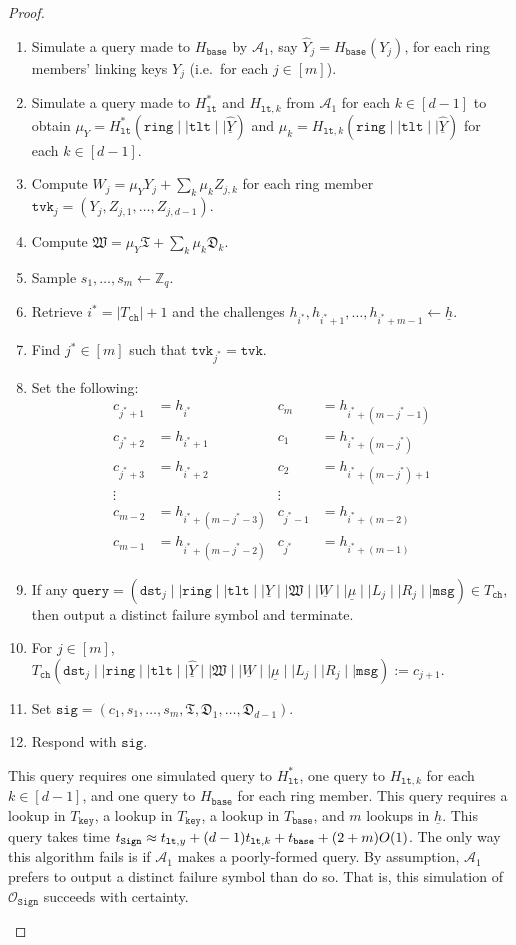 \documentclass[11pt]{article}
\theoremstyle{definition}
\newcommand{\lt}{\texttt{lt}}
\newcommand{\tlt}{\texttt{tlt}}
\newcommand{\tvk}{\texttt{tvk}}
\newcommand{\ring}{\texttt{ring}}
\newcommand{\sig}{\texttt{sig}}
\newcommand{\Zq}{\mathbb{Z}_q}
\newcommand{\msg}{\texttt{msg}}
\newcommand{\sign}{\texttt{Sign}}
\newcommand{\signingOracle}{\mathcal{O}_{\sign}}
\newcommand{\signaturequery}{(\texttt{dst}_{j} \mid \mid \ring \mid \mid \tlt \mid \mid \underline{\widehat{Y}} \mid \mid \mathfrak{W} \mid \mid \underline{W} \mid \mid \underline{\mu} \mid \mid L_{j} \mid \mid R_{j} \mid \mid \msg)}
\begin{document}
\begin{proof}
\begin{enumerate}
\begin{enumerate}
\begin{enumerate}
\item Simulate a query made to $H_{\texttt{base}}$ by $\mathcal{A}_1$, say $\widehat{Y}_j = H_{\texttt{base}}(Y_j)$, for each ring members' linking keys $Y_j$ (i.e.\ for each $j \in [m]$).
\item Simulate a query made to $H_{\lt}^*$ and $H_{\lt, k}$ from $\mathcal{A}_1$ for each $k \in [d-1]$ to obtain $\mu_Y = H_{\lt}^*(\ring \mid \mid \tlt \mid \mid \underline{\widehat{Y}})$ and $\mu_k = H_{\lt, k}(\ring \mid \mid \tlt \mid \mid \underline{\widehat{Y}})$ for each $k \in [d-1]$.
\item Compute $W_j = \mu_Y Y_j + \sum_k \mu_k Z_{j,k}$ for each ring member $\tvk_j = (Y_j, Z_{j,1}, \ldots, Z_{j,d-1})$.
\item Compute $\mathfrak{W} = \mu_Y \mathfrak{T} + \sum_k \mu_k \mathfrak{D}_k$.
\item Sample $s_1, \ldots, s_m \leftarrow \Zq$.
\item Retrieve $i^* = \left|T_{\texttt{ch}}\right| + 1$ and the challenges $h_{i^*}, h_{i^*+1}, \ldots, h_{i^*+m-1} \leftarrow \underline{h}$.
\item Find $j^* \in [m]$ such that $\tvk_{j^*} = \tvk$.
\item Set the following:
\begin{align*}
c_{j^*+1} &= h_{i^*} & c_m &= h_{i^* + (m-j^* - 1)} \\
c_{j^*+2} &= h_{i^*+1} & c_1 &= h_{i^* + (m-j^*)} \\
c_{j^*+3} &= h_{i^*+2} & c_2 &= h_{i^* + (m-j^*) + 1} \\
\vdots & & \vdots & \\
c_{m-2} &= h_{i^* + (m-j^*-3)} & c_{j^* - 1} &= h_{i^* + (m-2)} \\
c_{m-1} &= h_{i^* + (m-j^*-2)} & c_{j^*} &= h_{i^* + (m-1)}
\end{align*}
\item If any
$\texttt{query} = \signaturequery \in T_{\texttt{ch}}$, then output a distinct failure symbol and terminate. 

\item For $j \in [m]$, $T_{\texttt{ch}}\signaturequery := c_{j+1}$.
\item Set $\sig = (c_1, s_1, \ldots, s_m, \mathfrak{T}, \mathfrak{D}_1, \ldots, \mathfrak{D}_{d-1})$.
\item Respond with $\sig$.
\end{enumerate}
This query requires one simulated query to $H_{\lt}^*$, one query to $H_{\lt, k}$ for each $k \in [d-1]$, and one query to $H_{\texttt{base}}$ for each ring member. This query requires a lookup in $T_{\texttt{key}}$, a lookup in $T_{\texttt{key}}$, a lookup in $T_{\texttt{base}}$, and $m$ lookups in $\underline{h}$. This query takes time $t_{\texttt{\sign}} \approx t_{\lt, y} + (d-1)t_{\lt,k} + t_{\texttt{base}} + (2+m)O(1)$. The only way this algorithm fails is if $\mathcal{A}_1$ makes a poorly-formed query. By assumption, $\mathcal{A}_1$ prefers to output a distinct failure symbol than do so. That is, this simulation of $\signingOracle$ succeeds with certainty. 
\end{enumerate}



\end{enumerate}
\end{proof}
\end{document}
